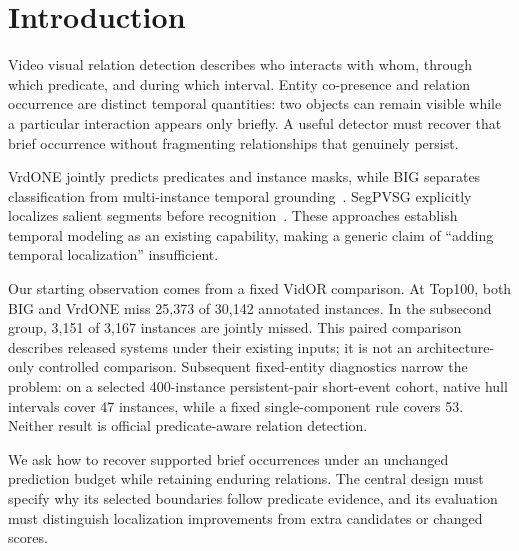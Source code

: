 \section{Introduction}
Video visual relation detection describes who interacts with whom, through which
predicate, and during which interval. Entity co-presence and relation occurrence
are distinct temporal quantities: two objects can remain visible while a
particular interaction appears only briefly. A useful detector must recover that
brief occurrence without fragmenting relationships that genuinely persist.

VrdONE jointly predicts predicates and instance masks, while BIG separates
classification from multi-instance temporal grounding~\cite{vrdone,big}.
SegPVSG explicitly localizes salient segments before recognition~\cite{segpvsg}.
These approaches establish temporal modeling as an existing capability, making a
generic claim of ``adding temporal localization'' insufficient.

Our starting observation comes from a fixed VidOR comparison. At Top100, both
BIG and VrdONE miss 25,373 of 30,142 annotated instances. In the subsecond group,
3,151 of 3,167 instances are jointly missed. This paired comparison describes
released systems under their existing inputs; it is not an architecture-only
controlled comparison. Subsequent fixed-entity diagnostics narrow the problem:
on a selected 400-instance persistent-pair short-event cohort, native hull
intervals cover 47 instances, while a fixed single-component rule covers 53.
Neither result is official predicate-aware relation detection.

We ask how to recover supported brief occurrences under an unchanged prediction
budget while retaining enduring relations. The central design must specify why
its selected boundaries follow predicate evidence, and its evaluation must
distinguish localization improvements from extra candidates or changed scores.
